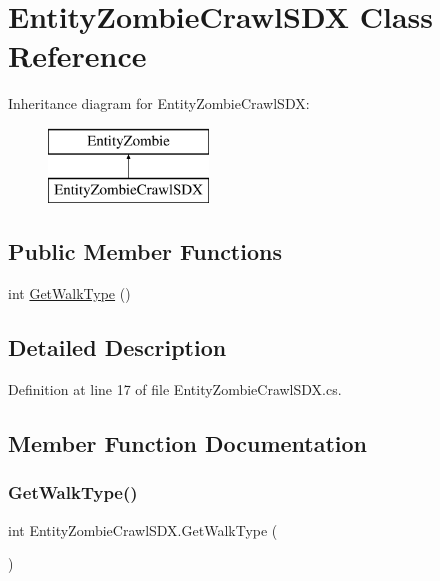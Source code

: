 \hypertarget{class_entity_zombie_crawl_s_d_x}{}\section{Entity\+Zombie\+Crawl\+S\+DX Class Reference}
\label{class_entity_zombie_crawl_s_d_x}
Inheritance diagram for Entity\+Zombie\+Crawl\+S\+DX\+:\begin{figure}[H]
\begin{center}
\leavevmode
\includegraphics[height=2.000000cm]{class_entity_zombie_crawl_s_d_x}
\end{center}
\end{figure}
\subsection*{Public Member Functions}
\begin{DoxyCompactItemize}
\item 
int \mbox{\hyperlink{class_entity_zombie_crawl_s_d_x_af7241973a6da363edabc8350b30b55bb}{Get\+Walk\+Type}} ()
\end{DoxyCompactItemize}


\subsection{Detailed Description}


Definition at line 17 of file Entity\+Zombie\+Crawl\+S\+D\+X.\+cs.



\subsection{Member Function Documentation}
\mbox{\label{class_entity_zombie_crawl_s_d_x_af7241973a6da363edabc8350b30b55bb}} 
\subsubsection{\texorpdfstring{GetWalkType()}{GetWalkType()}}
{\footnotesize\ttfamily int Entity\+Zombie\+Crawl\+S\+D\+X.\+Get\+Walk\+Type (\begin{DoxyParamCaption}{ }\end{DoxyParamCaption})}



